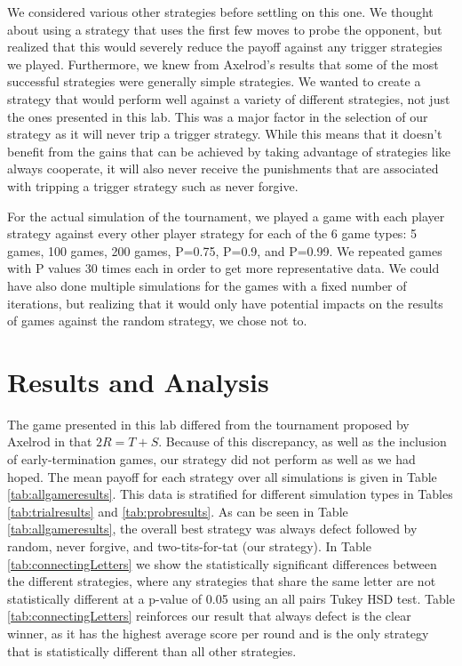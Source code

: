 \documentclass[a4paper]{article}
\begin{document}
We considered various other strategies before settling on this one. We thought about using a strategy that uses the first few moves to probe the opponent, but realized that this would severely reduce the payoff against any trigger strategies we played. Furthermore, we knew from Axelrod's results that some of the most successful strategies were generally simple strategies.  We wanted to create a strategy that would perform well against a variety of different strategies, not just the ones presented in this lab.  This was a major factor in the selection of our strategy as it will never trip a trigger strategy.  While this means that it doesn't benefit from the gains that can be achieved by taking advantage of strategies like always cooperate, it will also never receive the punishments that are associated with tripping a trigger strategy such as never forgive.

For the actual simulation of the tournament, we played a game with each player strategy against every other player strategy for each of the 6 game types: 5 games, 100 games, 200 games, P=0.75, P=0.9, and P=0.99. We repeated games with P values 30 times each in order to get more representative data. We could have also done multiple simulations for the games with a fixed number of iterations, but realizing that it would only have potential impacts on the results of games against the random strategy, we chose not to.

\section{Results and Analysis}
The game presented in this lab differed from the tournament proposed by Axelrod in that $2R = T + S$. Because of this discrepancy, as well as the inclusion of early-termination games, our strategy did not perform as well as we had hoped. The mean payoff for each strategy over all simulations is given in Table \ref{tab:allgameresults}. This data is stratified for different simulation types in Tables \ref{tab:trialresults} and \ref{tab:probresults}.  As can be seen in Table \ref{tab:allgameresults}, the overall best strategy was always defect followed by random, never forgive, and two-tits-for-tat (our strategy).  In Table \ref{tab:connectingLetters} we show the statistically significant differences between the different strategies, where any strategies that share the same letter are not statistically different at a p-value of 0.05 using an all pairs Tukey HSD test. Table \ref{tab:connectingLetters} reinforces our result that always defect is the clear winner, as it has the highest average score per round and is the only strategy that is statistically different than all other strategies.
\end{document}
